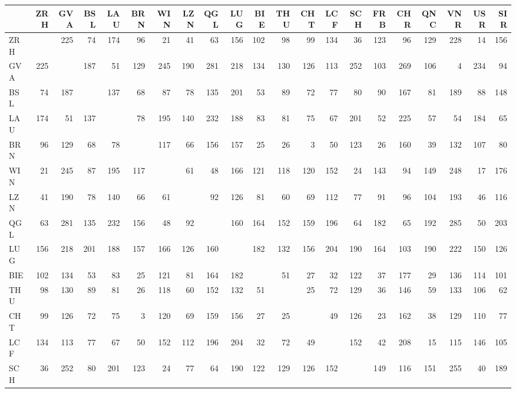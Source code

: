 \documentclass[12pt,a4paper]{report}
\theoremstyle{break}
\theoremstyle{plain}
\begin{document}
\newpage
\pagestyle{empty}
\begin{sideways}
\footnotesize
\begin{tabular}{|l|r|r|r|r|r|r|r|r|r|r||r|r|r|r|r|r|r|r|r|r|}\hline
 & ZRH & GVA & BSL & LAU & BRN & WIN & LZN & QGL & LUG & BIE & THU & CHT & LCF & SCH & FRB & CHR & QNC & VNR & USR & SIR \\ \hline
ZRH & & 225 &  74 & 174 &  96 &  21 &  41 &  63 & 156 & 102 &  98 &  99 & 134 &  36 & 123 &  96 & 129 & 228 &  14 & 156 \\
GVA & 225 & & 187 &  51 & 129 & 245 & 190 & 281 & 218 & 134 & 130 & 126 & 113 & 252 & 103 & 269 & 106 &   4 & 234 &  94 \\
BSL &  74 & 187 & & 137 &  68 &  87 &  78 & 135 & 201 &  53 &  89 &  72 &  77 &  80 &  90 & 167 &  81 & 189 &  88 & 148 \\
LAU & 174 &  51 & 137 & &  78 & 195 & 140 & 232 & 188 &  83 &  81 &  75 &  67 & 201 &  52 & 225 &  57 &  54 & 184 &  65 \\
BRN &  96 & 129 &  68 &  78 & & 117 &  66 & 156 & 157 &  25 &  26 &   3 &  50 & 123 &  26 & 160 &  39 & 132 & 107 &  80 \\
WIN &  21 & 245 &  87 & 195 & 117 & &  61 &  48 & 166 & 121 & 118 & 120 & 152 &  24 & 143 &  94 & 149 & 248 &  17 & 176 \\
LZN &  41 & 190 &  78 & 140 &  66 &  61 & &  92 & 126 &  81 &  60 &  69 & 112 &  77 &  91 &  96 & 104 & 193 &  46 & 116 \\
QGL &  63 & 281 & 135 & 232 & 156 &  48 &  92 & & 160 & 164 & 152 & 159 & 196 &  64 & 182 &  65 & 192 & 285 &  50 & 203 \\
LUG & 156 & 218 & 201 & 188 & 157 & 166 & 126 & 160 & & 182 & 132 & 156 & 204 & 190 & 164 & 103 & 190 & 222 & 150 & 126 \\
BIE & 102 & 134 &  53 &  83 &  25 & 121 &  81 & 164 & 182 & &  51 &
27 &  32 & 122 &  37 & 177 &  29 & 136 & 114 & 101 \\ \hline
THU &  98 & 130 &  89 &  81 &  26 & 118 &  60 & 152 & 132 &  51 & &  25 &  72 & 129 &  36 & 146 &  59 & 133 & 106 &  62 \\
CHT &  99 & 126 &  72 &  75 &   3 & 120 &  69 & 159 & 156 &  27 &  25 & &  49 & 126 &  23 & 162 &  38 & 129 & 110 &  77 \\
LCF & 134 & 113 &  77 &  67 &  50 & 152 & 112 & 196 & 204 &  32 &  72 &  49 & & 152 &  42 & 208 &  15 & 115 & 146 & 105 \\
SCH &  36 & 252 &  80 & 201 & 123 &  24 &  77 &  64 & 190 & 122 & 129 & 126 & 152 & & 149 & 116 & 151 & 255 &  40 & 189 \\

\end{tabular}
\end{sideways}
\end{document}
